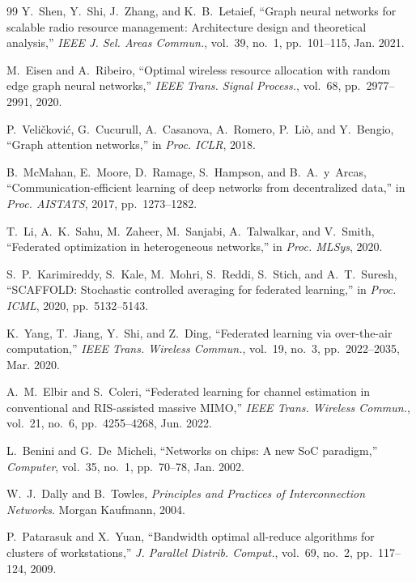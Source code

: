 \documentclass[conference]{IEEEtran}
\begin{document}
\begin{thebibliography}{99}
Y.~Shen, Y.~Shi, J.~Zhang, and K.~B.~Letaief, ``Graph neural networks for scalable radio resource management: Architecture design and theoretical analysis,'' \emph{IEEE J. Sel. Areas Commun.}, vol.~39, no.~1, pp.~101--115, Jan. 2021.

M.~Eisen and A.~Ribeiro, ``Optimal wireless resource allocation with random edge graph neural networks,'' \emph{IEEE Trans. Signal Process.}, vol.~68, pp.~2977--2991, 2020.

P.~Veli\v{c}kovi\'{c}, G.~Cucurull, A.~Casanova, A.~Romero, P.~Li\`{o}, and Y.~Bengio, ``Graph attention networks,'' in \emph{Proc. ICLR}, 2018.

B.~McMahan, E.~Moore, D.~Ramage, S.~Hampson, and B.~A.~y~Arcas, ``Communication-efficient learning of deep networks from decentralized data,'' in \emph{Proc. AISTATS}, 2017, pp.~1273--1282.

T.~Li, A.~K.~Sahu, M.~Zaheer, M.~Sanjabi, A.~Talwalkar, and V.~Smith, ``Federated optimization in heterogeneous networks,'' in \emph{Proc. MLSys}, 2020.

S.~P.~Karimireddy, S.~Kale, M.~Mohri, S.~Reddi, S.~Stich, and A.~T.~Suresh, ``SCAFFOLD: Stochastic controlled averaging for federated learning,'' in \emph{Proc. ICML}, 2020, pp.~5132--5143.

K.~Yang, T.~Jiang, Y.~Shi, and Z.~Ding, ``Federated learning via over-the-air computation,'' \emph{IEEE Trans. Wireless Commun.}, vol.~19, no.~3, pp.~2022--2035, Mar. 2020.

A.~M.~Elbir and S.~Coleri, ``Federated learning for channel estimation in conventional and RIS-assisted massive MIMO,'' \emph{IEEE Trans. Wireless Commun.}, vol.~21, no.~6, pp.~4255--4268, Jun. 2022.

L.~Benini and G.~De~Micheli, ``Networks on chips: A new SoC paradigm,'' \emph{Computer}, vol.~35, no.~1, pp.~70--78, Jan. 2002.

W.~J.~Dally and B.~Towles, \emph{Principles and Practices of Interconnection Networks}. Morgan Kaufmann, 2004.

P.~Patarasuk and X.~Yuan, ``Bandwidth optimal all-reduce algorithms for clusters of workstations,'' \emph{J. Parallel Distrib. Comput.}, vol.~69, no.~2, pp.~117--124, 2009.

\end{thebibliography}
\end{document}
